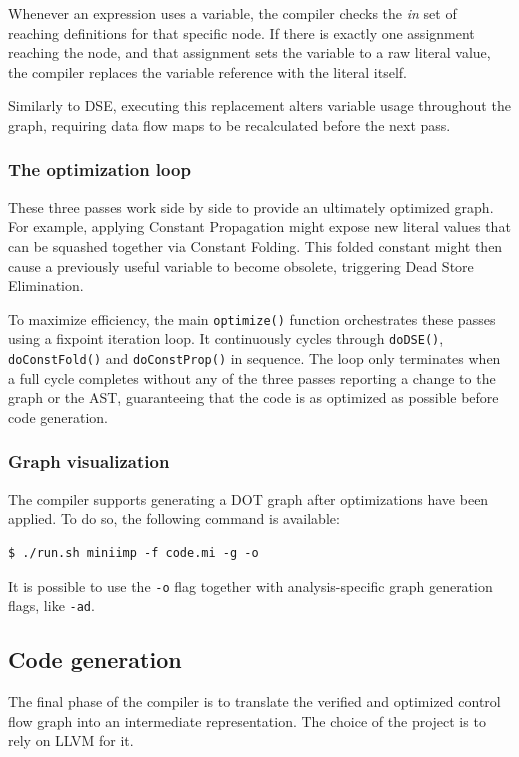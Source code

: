 \documentclass[12pt]{article}
\newcommand{\Code}[1]{\texttt{#1}}
\begin{document}
Whenever an expression uses a variable, the compiler checks the \textit{in} set
of reaching definitions for that specific node. If there is exactly one
assignment reaching the node, and that assignment sets the variable to a raw
literal value, the compiler replaces the variable reference with the literal
itself.

Similarly to DSE, executing this replacement alters variable usage throughout
the graph, requiring data flow maps to be recalculated before the next pass.

\subsubsection{The optimization loop}

These three passes work side by side to provide an ultimately optimized graph.
For example, applying Constant Propagation might expose new literal values that
can be squashed together via Constant Folding. This folded constant might then
cause a previously useful variable to become obsolete, triggering Dead Store
Elimination.

To maximize efficiency, the main \Code{optimize()} function orchestrates these
passes using a fixpoint iteration loop. It continuously cycles through
\Code{doDSE()}, \Code{doConstFold()} and \Code{doConstProp()} in sequence. The
loop only terminates when a full cycle completes without any of the three passes
reporting a change to the graph or the AST, guaranteeing that the code is as
optimized as possible before code generation.

\subsubsection{Graph visualization}

The compiler supports generating a DOT graph after optimizations have been
applied. To do so, the following command is available:
\begin{verbatim}
$ ./run.sh miniimp -f code.mi -g -o
\end{verbatim}

It is possible to use the \texttt{-o} flag together with analysis-specific graph
generation flags, like \texttt{-ad}.

\subsection{Code generation}

The final phase of the compiler is to translate the verified and optimized
control flow graph into an intermediate representation. The choice of the
project is to rely on LLVM for it.
\end{document}
